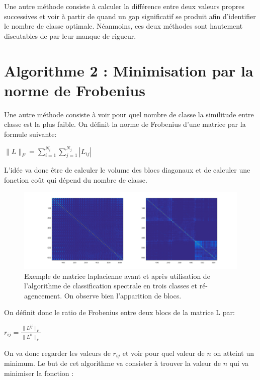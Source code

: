 \medskip

Une autre méthode consiste à calculer la différence entre deux valeurs propres successives et voir à partir de quand un gap significatif se produit afin d'identifier le nombre de classe optimale. Néanmoins, ces deux méthodes sont hautement discutables de par leur manque de rigueur.


\section*{Algorithme 2 : Minimisation par la norme de Frobenius}

Une autre méthode consiste à voir pour quel nombre de classe la similitude entre classe est la plus faible.
On définit la norme de Frobenius d'une matrice par la formule suivante:

\medskip
$
\|{L}\|_F = \sum_{i=1}^{N_i}  \sum_{j=1}^{N_j} |L_{ij}|
$
\medskip

L'idée va donc être de calculer le volume des blocs diagonaux et de calculer une fonction coût qui dépend du nombre de classe.

\begin{figure}[H]
\centering
    \includegraphics[scale=0.4,angle=0]{Images/L.png}
    \caption{Exemple de matrice laplacienne avant et après utilisation de l'algorithme de classification spectrale en trois classes et ré-agencement. On observe bien l'apparition de blocs.}
    \label{fig:L}
\end{figure} 

On définit donc le ratio de Frobenius entre deux blocs de la matrice L par:

\medskip

$
r_{ij} = \frac{ \|{L^{ij}}\|_F }{\| L^{ii} \|_F}
$

\medskip

On va donc regarder les valeurs de $r_{ij}$ et voir pour quel valeur de $n$ on atteint un minimum. Le but de cet algorithme va consister à trouver la valeur de $n$ qui va minimiser la fonction :

